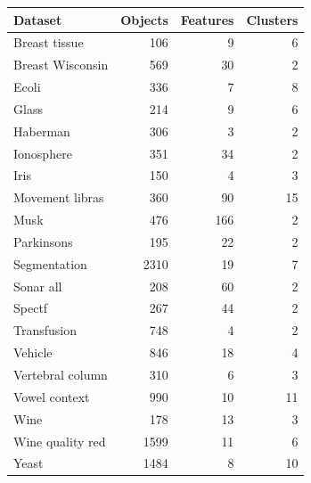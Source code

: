 \begin{tabular}{lrrr}
\toprule
Dataset & Objects & Features & Clusters \\
\midrule
Breast tissue & 106 & 9 & 6 \\
Breast Wisconsin & 569 & 30 & 2 \\
Ecoli & 336 & 7 & 8 \\
Glass & 214 & 9 & 6 \\
Haberman & 306 & 3 & 2 \\
Ionosphere & 351 & 34 & 2 \\
Iris & 150 & 4 & 3 \\
Movement libras & 360 & 90 & 15 \\
Musk & 476 & 166 & 2 \\
Parkinsons & 195 & 22 & 2 \\
Segmentation & 2310 & 19 & 7 \\
Sonar all & 208 & 60 & 2 \\
Spectf & 267 & 44 & 2 \\
Transfusion & 748 & 4 & 2 \\
Vehicle & 846 & 18 & 4 \\
Vertebral column & 310 & 6 & 3 \\
Vowel context & 990 & 10 & 11 \\
Wine & 178 & 13 & 3 \\
Wine quality red & 1599 & 11 & 6 \\
Yeast & 1484 & 8 & 10 \\
\bottomrule
\end{tabular}
